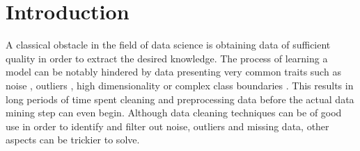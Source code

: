 \documentclass[
	fontsize=11pt, %
	twoside=false, %
	open=any, %
	secnumdepth=1, %
]{kaobook}
\begin{document}
%

\section{Introduction}\label{sec.intro}

% 
% 
% 

A classical obstacle in the field of data science is obtaining data of sufficient quality in order to extract the desired knowledge. The process of learning a model can be notably hindered by data presenting very common traits such as noise \cite{xiong2006enhancing}, outliers \cite{aggarwal2015outlier}, high dimensionality \cite{AYESHA202044} or complex class boundaries \cite{ho2000measuring}. This results in long periods of time spent cleaning and preprocessing data \cite{garcia2015data} before the actual data mining step can even begin.
Although data cleaning techniques can be of good use in order to identify and filter out noise, outliers and missing data, other aspects can be trickier to solve.
\end{document}
